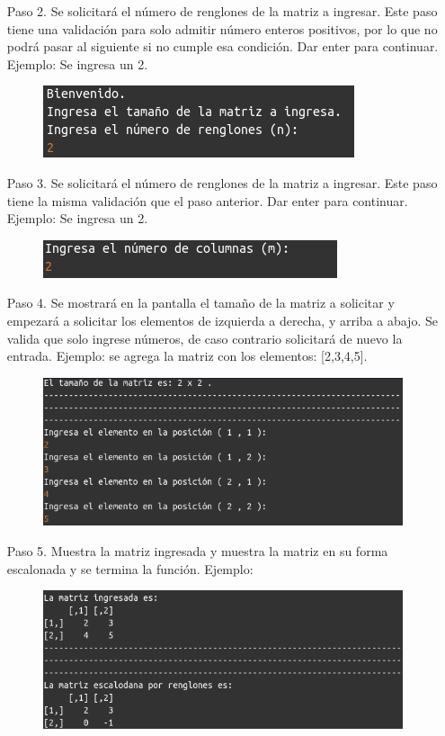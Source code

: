 \documentclass[11pt,letterpaper]{article}
\begin{document}
\begin{enumerate}
\begin{itemize}
\item[Paso 2.] Se solicitará el número de renglones de la matriz a ingresar. Este paso tiene una validación para solo admitir número enteros positivos, por lo que no podrá pasar al siguiente si no cumple esa condición. Dar enter para continuar. Ejemplo: Se ingresa un 2.
\begin{figure}[H]
\centering
\includegraphics[scale=.7]{paso_2.png}
\end{figure}
\item[Paso 3.] Se solicitará el número de renglones de la matriz a ingresar. Este paso tiene la misma validación que el paso anterior. Dar enter para continuar. Ejemplo: Se ingresa un 2.
\begin{figure}[H]
\centering
\includegraphics[scale=.7]{paso_3.png}
\end{figure}
\item[Paso 4.] Se mostrará en la pantalla el tamaño de la matriz a solicitar y empezará a solicitar los elementos de izquierda a derecha, y arriba a abajo. Se valida que solo ingrese números, de caso contrario solicitará de nuevo la entrada. Ejemplo: se agrega la matriz con los elementos: [2,3,4,5].
\begin{figure}[H]
\centering
\includegraphics[scale=.7]{paso_4.png}
\end{figure}
\item[Paso 5.] Muestra la matriz ingresada y muestra la matriz en su forma escalonada y se termina la función. Ejemplo:
\begin{figure}[H]
\centering
\includegraphics[scale=.7]{paso_5_2.png}
\end{figure}
\end{itemize}
\end{enumerate}
\end{document}

